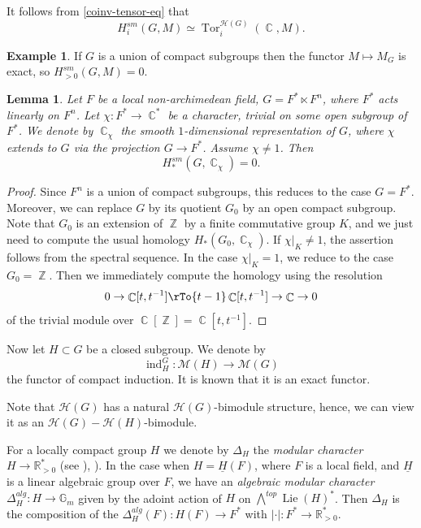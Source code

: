 \documentclass[12pt,reqno]{amsart}
\DeclareMathOperator\C{\mathbb C}
\DeclareMathOperator\Z{\mathbb Z}
\newtheorem{lemma}[theorem]{Lemma}
\theoremstyle{definition}
\newtheorem{example}[theorem]{Example}
\theoremstyle{remark}
\numberwithin{equation}{section}
\newcommand{\Lie}{\operatorname{Lie}}
\newcommand{\ind}{\operatorname{ind}}
\newcommand{\Tor}{\operatorname{Tor}}
\newcommand{\De}{\Delta}
\newcommand{\und}{\underline}
\newcommand{\HH}{{\mathcal H}}
\newcommand{\MM}{{\mathcal M}}
\newcommand{\sub}{\subset}
\newcommand{\G}{{\mathbb G}}
\newcommand{\fh}{{\mathfrak h}}
\newcommand{\R}{{\mathbb R}}
\begin{document}
It follows from \eqref{coinv-tensor-eq} that 
$$H^{sm}_i(G,M)\simeq \Tor_i^{\HH(G)}(\C,M).$$

\begin{example}
If $G$ is a union of compact subgroups then the functor $M\mapsto M_G$ is exact, so $H^{sm}_{>0}(G,M)=0$.
\end{example}

\begin{lemma}\label{sm-hom-char-lem}
Let $F$ be a local non-archimedean field, $G=F^*\ltimes F^n$, where $F^*$ acts linearly on $F^n$.
Let $\chi:F^*\to \C^*$ be a character, trivial on some open subgroup of $F^*$. We denote by $\C_\chi$ the smooth $1$-dimensional
representation of $G$, where $\chi$ extends to $G$ via the projection $G\to F^*$. Assume $\chi\neq 1$. Then
$$H^{sm}_*(G,\C_\chi)=0.$$
\end{lemma}

\begin{proof}
Since $F^n$ is a union of compact subgroups, this reduces to the case $G=F^*$. Moreover, we can replace $G$ by
its quotient $G_0$ by an open compact subgroup. Note that $G_0$ is an extension of $\Z$ by a finite commutative group $K$,
and we just need to compute the usual homology $H_*(G_0,\C_\chi)$. If $\chi|_K\neq 1$, the assertion follows from the spectral sequence.
In the case $\chi|_K=1$, we reduce to the case $G_0=\Z$. Then we immediately compute the homology using the resolution 
$$0\to \C[t,t^{-1}]\rTo{t-1}\C[t,t^{-1}]\to \C\to 0$$
of the trivial module over $\C[\Z]=\C[t,t^{-1}]$.
\end{proof}

Now let $H\sub G$ be a closed subgroup. We denote by
$$\ind_H^G:\MM(H)\to \MM(G)$$
the functor of compact induction. It is known that it is an exact functor.

Note that $\HH(G)$ has a natural $\HH(G)$-bimodule structure, hence, we can view it
as an $\HH(G)-\HH(H)$-bimodule.

For a locally compact group $H$ we denote by $\De_H$ the {\it modular character} $H\to \R^*_{>0}$ (see \cite[0.5]{Cartier}), \cite[Sec.\ 1.19]{BZ}).
In the case when $H=\und{H}(F)$, where $F$ is a local field, and $\und{H}$ is a linear algebraic group over $F$,
we have an {\it algebraic modular character} $\De^{alg}_H:H\to \G_m$
given by the adoint action of $H$ on ${\bigwedge}^{top}\Lie(H)^*$. Then $\De_H$ is the composition of the $\De^{alg}_H(F):H(F)\to F^*$ with $|\cdot|:F^*\to \R^*_{>0}$.
\end{document}
